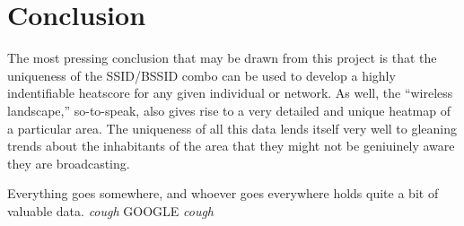 \documentclass[journal,twocolumn]{IEEEtran}
\begin{document}
\section{Conclusion}

The most pressing conclusion that may be drawn from this project is that the 
uniqueness of the SSID/BSSID combo can be used to develop a highly 
indentifiable heatscore for any given individual or network. As well, the
``wireless landscape,'' so-to-speak, also gives rise to a very detailed and
unique heatmap of a particular area. The uniqueness of all this data lends
itself very well to gleaning trends about the inhabitants of the area that they
might not be geniuinely aware they are broadcasting.

Everything goes somewhere, and whoever goes everywhere holds quite a bit of 
valuable data. \emph{cough} GOOGLE \emph{cough}



%

%
\end{document}
